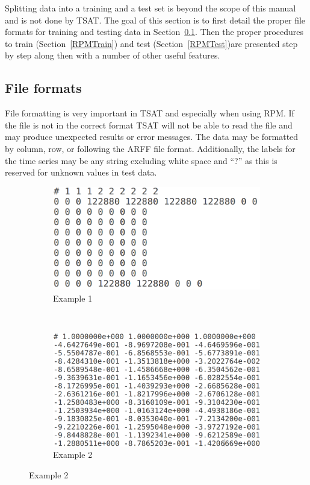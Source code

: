 \documentclass[titlepage, letterpaper, 12pt]{article}
\begin{document}
Splitting data into a training and a test set is beyond the scope of this manual and is not done by TSAT. The goal of this section is to first detail the proper file formats for training and testing data in Section~\ref{RPMFile}. Then the proper procedures to train (Section~\ref{RPMTrain}) and test (Section~\ref{RPMTest})are presented step by step along then with a number of other useful features. 

\subsection{File formats}
\label{RPMFile}
File formatting is very important in TSAT and especially when using RPM.  If the file is not in the correct format TSAT will not be able to read the file and may produce unexpected results or error messages.  The data may be formatted by column, row, or following the ARFF file format. Additionally, the labels for the time series may be any string excluding white space and ``?'' as this is reserved for unknown values in test data.

\begin{figure}[h]
	\caption{Examples of RPM Data}
	\label{fig:rpm-data-exs}
	\begin{subfigure}[b]{0.5\textwidth}
		\includegraphics[width=\textwidth]{rpm_data_example_1}
		\caption{Example 1}
		\label{fig:rpm-data-ex-1}
	\end{subfigure}
	~
	\begin{subfigure}[b]{0.5\textwidth}
		\includegraphics[width=\textwidth]{rpm_data_example_2}
		\caption{Example 2}
		\label{fig:rpm-data-ex-2}
	\end{subfigure}
\end{figure}
\end{document}
